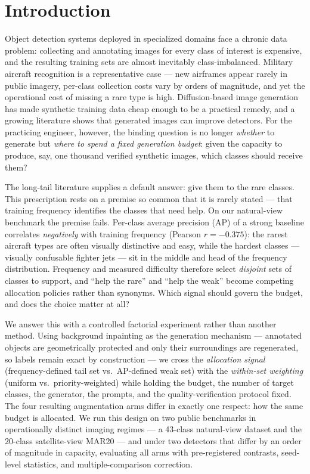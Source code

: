 \documentclass[preprint,12pt,authoryear]{elsarticle}
\begin{document}
\section{Introduction}\label{sec:intro}

Object detection systems deployed in specialized domains face a chronic
data problem: collecting and annotating images for every class of
interest is expensive, and the resulting training sets are almost
inevitably class-imbalanced. Military aircraft recognition is a
representative case --- new airframes appear rarely in public imagery,
per-class collection costs vary by orders of magnitude, and yet the
operational cost of missing a rare type is high. Diffusion-based image
generation has made synthetic training data cheap enough to be a
practical remedy, and a growing literature shows that generated images
can improve detectors. For the practicing engineer, however, the binding
question is no longer \emph{whether} to generate but \emph{where to
spend a fixed generation budget}: given the capacity to produce, say,
one thousand verified synthetic images, which classes should receive
them?

The long-tail literature supplies a default answer: give them to the
rare classes. This prescription rests on a premise so common that it is
rarely stated --- that training frequency identifies the classes that
need help. On our natural-view benchmark the premise fails. Per-class
average precision (AP) of a strong baseline correlates \emph{negatively}
with training frequency (Pearson $r = -0.375$): the rarest aircraft
types are often visually distinctive and easy, while the hardest classes
--- visually confusable fighter jets --- sit in the middle and head of
the frequency distribution. Frequency and measured difficulty therefore
select \emph{disjoint} sets of classes to support, and ``help the
rare'' and ``help the weak'' become competing allocation policies rather
than synonyms. Which signal should govern the budget, and does the
choice matter at all?

We answer this with a controlled factorial experiment rather than
another method. Using background inpainting as the generation mechanism
--- annotated objects are geometrically protected and only their
surroundings are regenerated, so labels remain exact by construction ---
we cross the \emph{allocation signal} (frequency-defined tail set vs.\
AP-defined weak set) with the \emph{within-set weighting} (uniform vs.\
priority-weighted) while holding the budget, the number of target
classes, the generator, the prompts, and the quality-verification
protocol fixed. The four resulting augmentation arms differ in exactly
one respect: how the same budget is allocated. We run this design on two
public benchmarks in operationally distinct imaging regimes --- a
43-class natural-view dataset and the 20-class satellite-view MAR20 ---
and under two detectors that differ by an order of magnitude in
capacity, evaluating all arms with pre-registered contrasts, seed-level
statistics, and multiple-comparison correction.
\end{document}
